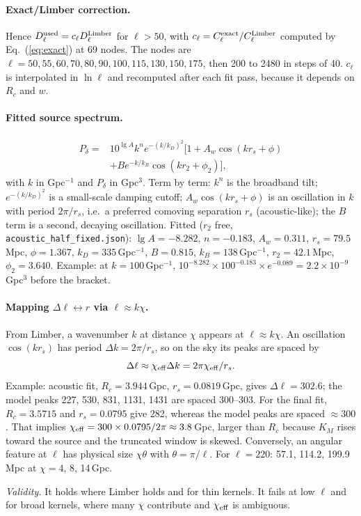 \documentclass[10pt,twocolumn]{article}
\newcommand{\why}[1]{\par\noindent\textit{Validity.} #1\par}
\begin{document}
\paragraph{Exact/Limber correction.} Hence $D^{\rm used}_\ell=c_\ell D^{\rm Limber}_\ell$ for $\ell>50$, with $c_\ell=C^{\rm exact}_\ell/C^{\rm Limber}_\ell$ computed by Eq.~(\ref{eq:exact}) at 69 nodes. The nodes are $\ell=50,55,60,70,80,90,100,115,130,150,175$, then 200 to 2480 in steps of 40. $c_\ell$ is interpolated in $\ln\ell$ and recomputed after each fit pass, because it depends on $R_c$ and $w$.

\paragraph{Fitted source spectrum.} 
\begin{equation}\begin{split}
\label{eq:Pd}P_\delta=&10^{\lg A}k^{n}e^{-(k/k_D)^2}\big[1+A_w\cos(kr_s+\phi)\\
&+Be^{-k/k_B}\cos(kr_2+\phi_2)\big],
\end{split}\end{equation}
with $k$ in Gpc$^{-1}$ and $P_\delta$ in Gpc$^3$. Term by term: $k^n$ is the broadband tilt; $e^{-(k/k_D)^2}$ is a small-scale damping cutoff; $A_w\cos(kr_s+\phi)$ is an oscillation in $k$ with period $2\pi/r_s$, i.e.\ a preferred comoving separation $r_s$ (acoustic-like); the $B$ term is a second, decaying oscillation. Fitted ($r_2$ free, \texttt{acoustic\_half\_fixed.json}): $\lg A=-8.282$, $n=-0.183$, $A_w=0.311$, $r_s=79.5$\,Mpc, $\phi=1.367$, $k_D=335$\,Gpc$^{-1}$, $B=0.815$, $k_B=138$\,Gpc$^{-1}$, $r_2=42.1$\,Mpc, $\phi_2=3.640$. Example: at $k=100$\,Gpc$^{-1}$, $10^{-8.282}\times100^{-0.183}\times e^{-0.089}=2.2\times10^{-9}$\,Gpc$^3$ before the bracket.

\paragraph{Mapping $\Delta\ell\leftrightarrow r$ via $\ell\approx k\chi$.} From Limber, a wavenumber $k$ at distance $\chi$ appears at $\ell\approx k\chi$. An oscillation $\cos(kr_s)$ has period $\Delta k=2\pi/r_s$, so on the sky its peaks are spaced by
\begin{equation}
\Delta\ell\approx\chi_{\rm eff}\Delta k=2\pi\chi_{\rm eff}/r_s .\label{eq:dl}
\end{equation}
Example: acoustic fit, $R_c=3.944$\,Gpc, $r_s=0.0819$\,Gpc, gives $\Delta\ell=302.6$; the model peaks 227, 530, 831, 1131, 1431 are spaced 300--303. For the final fit, $R_c=3.5715$ and $r_s=0.0795$ give 282, whereas the model peaks are spaced $\approx300$. That implies $\chi_{\rm eff}=300\times0.0795/2\pi\approx3.8$\,Gpc, larger than $R_c$ because $K_M$ rises toward the source and the truncated window is skewed. Conversely, an angular feature at $\ell$ has physical size $\chi\theta$ with $\theta=\pi/\ell$. For $\ell=220$: 57.1, 114.2, 199.9\,Mpc at $\chi=4$, 8, 14\,Gpc.
\why{It holds where Limber holds and for thin kernels. It fails at low $\ell$ and for broad kernels, where many $\chi$ contribute and $\chi_{\rm eff}$ is ambiguous.}
\end{document}
